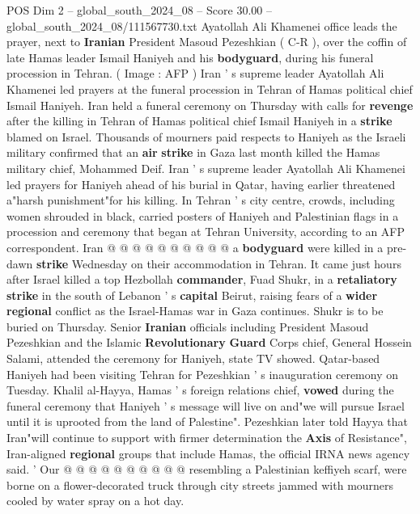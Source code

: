 \begin{textsample}{POS Dim 2 – global\_south\_2024\_08 – Score 30.00 – global\_south\_2024\_08/111567730.txt}  \label{ex:f2_pos_013}
Ayatollah Ali Khamenei office leads the prayer, next to \textbf{Iranian} President Masoud Pezeshkian ( C-R ), over the coffin of late Hamas leader Ismail Haniyeh and his \textbf{bodyguard}, during his funeral procession in Tehran. ( Image : AFP ) Iran ' s supreme leader Ayatollah Ali Khamenei led prayers at the funeral procession in Tehran of Hamas political chief Ismail Haniyeh.
Iran held a funeral ceremony on Thursday with calls for \textbf{revenge} after the killing in Tehran of Hamas political chief Ismail Haniyeh in a \textbf{strike} blamed on Israel.
Thousands of mourners paid respects to Haniyeh as the Israeli military confirmed that an \textbf{air} \textbf{strike} in Gaza last month killed the Hamas military chief, Mohammed Deif.
Iran ' s supreme leader Ayatollah Ali Khamenei led prayers for Haniyeh ahead of his burial in Qatar, having earlier threatened a"harsh punishment"for his killing.
In Tehran ' s city centre, crowds, including women shrouded in black, carried posters of Haniyeh and Palestinian flags in a procession and ceremony that began at Tehran University, according to an AFP correspondent.
Iran @ @ @ @ @ @ @ @ @ @ a \textbf{bodyguard} were killed in a pre-dawn \textbf{strike} Wednesday on their accommodation in Tehran.
It came just hours after Israel killed a top Hezbollah \textbf{commander}, Fuad Shukr, in a \textbf{retaliatory} \textbf{strike} in the south of Lebanon ' s \textbf{capital} Beirut, raising fears of a \textbf{wider} \textbf{regional} conflict as the Israel-Hamas war in Gaza continues.
Shukr is to be buried on Thursday.
Senior \textbf{Iranian} officials including President Masoud Pezeshkian and the Islamic \textbf{Revolutionary} \textbf{Guard} Corps chief, General Hossein Salami, attended the ceremony for Haniyeh, state TV showed.
Qatar-based Haniyeh had been visiting Tehran for Pezeshkian ' s inauguration ceremony on Tuesday.
Khalil al-Hayya, Hamas ' s foreign relations chief, \textbf{vowed} during the funeral ceremony that Haniyeh ' s message will live on and"we will pursue Israel until it is uprooted from the land of Palestine".
Pezeshkian later told Hayya that Iran"will continue to support with firmer determination the \textbf{Axis} of Resistance", Iran-aligned \textbf{regional} groups that include Hamas, the official IRNA news agency said. ' Our @ @ @ @ @ @ @ @ @ @ resembling a Palestinian keffiyeh scarf, were borne on a flower-decorated truck through city streets jammed with mourners cooled by water spray on a hot day.

\end{textsample}
